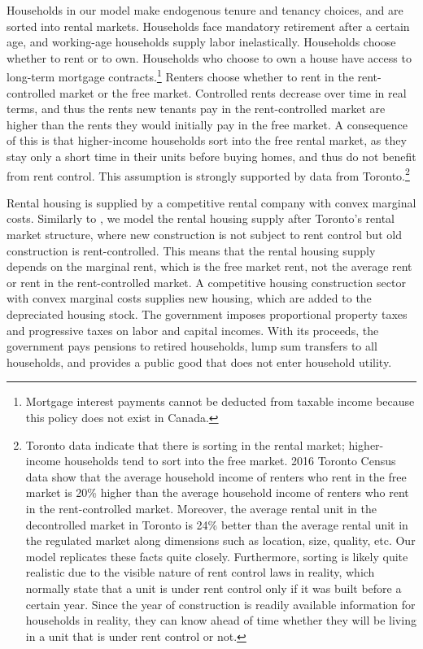 \documentclass[parskip=full]{article}
\begin{document}
Households in our model make endogenous tenure and tenancy choices, and are sorted into rental markets. Households face mandatory retirement after a certain age, and working-age households supply labor inelastically. Households choose whether to rent or to own. Households who choose to own a house have access to long-term mortgage contracts.\footnote{Mortgage interest payments cannot be deducted from taxable income because this policy does not exist in Canada.} Renters choose whether to rent in the rent-controlled market or the free market. Controlled rents decrease over time in real terms, and thus the rents new tenants pay in the rent-controlled market are higher than the rents they would initially pay in the free market. A consequence of this is that higher-income households sort into the free rental market, as they stay only a short time in their units before buying homes, and thus do not benefit from rent control. This assumption is strongly supported by data from Toronto.\footnote{Toronto data indicate that there is sorting in the rental market; higher-income households tend to sort into the free market. 2016 Toronto Census data show that the average household income of renters who rent in the free market is 20\% higher than the average household income of renters who rent in the rent-controlled market. Moreover, the average rental unit in the decontrolled market in Toronto is 24\% better than the average rental unit in the regulated market \citep{zhang-gou} along dimensions such as location, size, quality, etc. Our model replicates these facts quite closely. Furthermore, sorting is likely quite realistic due to the visible nature of rent control laws in reality, which normally state that a unit is under rent control only if it was built before a certain year. Since the year of construction is readily available information for households in reality, they can know ahead of time whether they will be living in a unit that is under rent control or not.}

Rental housing is supplied by a competitive rental company with convex marginal costs. Similarly to \citet{fallis-1985}, we model the rental housing supply after Toronto's rental market structure, where new construction is not subject to rent control but old construction is rent-controlled. This means that the rental housing supply depends on the marginal rent, which is the free market rent, not the average rent or rent in the rent-controlled market. A competitive housing construction sector with convex marginal costs supplies new housing, which are added to the depreciated housing stock. The government imposes proportional property taxes and progressive taxes on labor and capital incomes. With its proceeds, the government pays pensions to retired households, lump sum transfers to all households, and provides a public good that does not enter household utility. 
\end{document}
